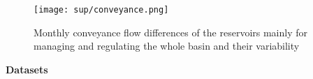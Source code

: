 \documentclass[draft,wrr]{../agutexSI2019}
\begin{document}
\begin{article}


\begin{figure}[htb]
      \centering
      \texttt{[image: sup/conveyance.png]}
      \caption{Monthly conveyance flow differences of the reservoirs mainly for managing and regulating the whole basin and their variability}\label{fig:conveyance}
\end{figure}

\noindent\textbf{Datasets}\label{secA3}










%
%



%
%

\end{article}
\clearpage
\end{document}
